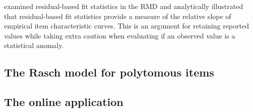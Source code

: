 \documentclass[11pt,a4paper]{article}
\begin{document}
 examined residual-based fit statistics in the RMD and analytically illustrated that residual-based fit statistics provide a measure of the relative slope of empirical item characteristic curves. This is an argument for retaining reported values while taking extra caution when evaluating if an observed value is a statistical anomaly.




\newpage

\begin{appendices}
\section{The Rasch model for polytomous items}\label{sec:Appendix-A-RMP}

\end{appendices}

\begin{appendices}
\section{The online application}\label{sec:Appendix-B-Shiny}

\end{appendices}
\end{document}
